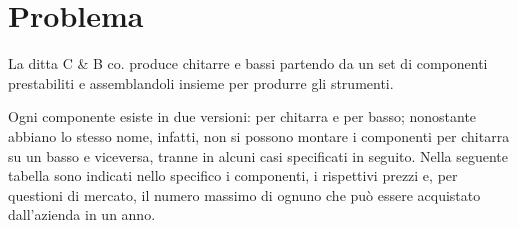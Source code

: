 \newpage
\section{Problema}
La ditta C \& B co. produce chitarre e bassi partendo da un set di componenti prestabiliti e assemblandoli insieme per produrre gli strumenti.
 
Ogni componente esiste in due versioni: per chitarra e per basso; nonostante abbiano lo stesso nome, infatti, non si possono montare i componenti per chitarra su un basso e viceversa, tranne in alcuni casi specificati in seguito. Nella seguente tabella sono indicati nello specifico i componenti, i rispettivi prezzi e, per questioni di mercato, il numero massimo di ognuno che può essere acquistato dall'azienda in un anno.

\begin{table}[htbp]
\end{table}
